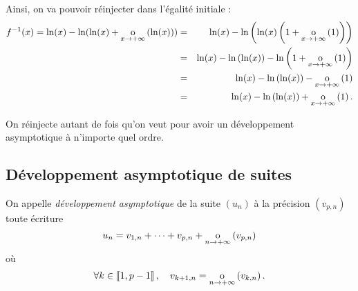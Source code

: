 \documentclass{magnolia}
\begin{document}
\begin{exos}
\begin{sol}
Ainsi, on va pouvoir réinjecter dans l'égalité initiale :
\begin{eqnarray*}
f^{-1}(x)=\ln(x)-\ln(\ln(x)+\underset{x \rightarrow +\infty}{\text{o}}\left(\ln(x)\right))&=&\ln(x)-\ln\left(\ln(x)\left(1+\underset{x \rightarrow +\infty}{\text{o}}\left(1\right)\right)\right)\\
&=&\ln(x)-\ln\left(\ln(x)\right)-\ln\left(1+\underset{x \rightarrow +\infty}{\text{o}}\left(1\right)\right)\\
&=&\ln(x)-\ln\left(\ln(x)\right)-\underset{x \rightarrow +\infty}{\text{o}}\left(1\right)\\
&=&\ln(x)-\ln\left(\ln(x)\right)+\underset{x \rightarrow +\infty}{\text{o}}\left(1\right).
\end{eqnarray*}
  
  On réinjecte autant de fois qu'on veut pour avoir un développement asymptotique à n'importe quel ordre.
  \end{sol}
\end{exos}

\subsection{Développement asymptotique de suites}

\begin{definition}[utile=-3]
On appelle \emph{développement asymptotique} de la suite $(u_n)$ à la précision $(v_{p,n})$ toute écriture
\[u_n=v_{1,n}+\cdots+v_{p,n} +\underset{n \rightarrow +\infty}{\text{o}}\left(v_{p,n}\right)\]
où
\[\forall k\in\left\llbracket 1,p-1\right\rrbracket ,\quad v_{k+1,n}=\underset{n \rightarrow +\infty}{\text{o}}\left(v_{k,n}\right).\]
\end{definition}
\end{document}
